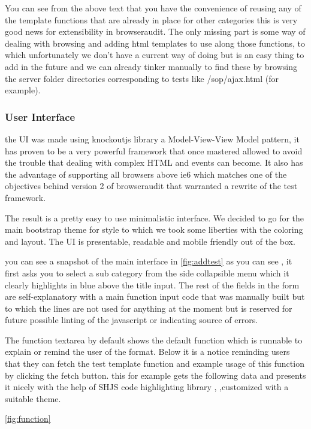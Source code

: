 You can see from the above text that you have the convenience of reusing any of the template functions that are already in place for other categories
this is very good news for extensibility in browseraudit. The only missing part is some way of dealing with browsing and adding html templates
to use along those functions, to which unfortunately we don't have a current way of doing but is an easy thing to add in the future and we
can already tinker manually to find these by browsing the server folder directories corresponding to tests like /sop/ajax.html (for example).

\subsubsection{User Interface}

the UI was made using knockoutjs \cite{knockoutjs} library a Model-View-View Model pattern, it has proven to be a very powerful framework that once mastered allowed
to avoid the trouble that dealing with complex HTML and events can become. It also has the advantage of supporting all browsers above ie6 which matches one
of the objectives behind version 2 of browseraudit that warranted a rewrite of the test framework.

The result is a pretty easy to use minimalistic interface. We decided to go for the main bootstrap theme for style to which we took some liberties
with the coloring and layout. The UI is presentable, readable and mobile friendly out of the box.

you can see a snapshot of the main interface in \ref{fig:addtest} as you can see , it first asks you to select a sub category from the side collapsible
menu which it clearly highlights in blue above the title input. The rest of the fields in the form are self-explanatory with a main function 
input code that was manually built but to which the lines are not used for anything at the moment but is reserved for future possible
linting of the javascript or indicating source of errors.

The function textarea by default shows the default function which is runnable to explain or remind the user of the format. 
Below it is a notice reminding users that they can fetch the test template function and example usage of this function by clicking the fetch
button. this for example gets the following data and presents it nicely with the help of SHJS code highlighting library , \cite{SHJS},customized with a suitable theme.

\ref{fig:function}


